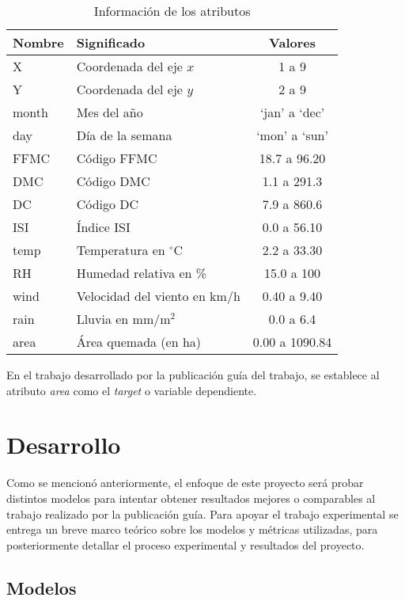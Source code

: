 \documentclass[spanish]{article}
\begin{document}
    \begin{table}[!ht]
    	\centering
      \caption{Información de los atributos}
      \begin{tabular}{llc}
      	\hline
      	Nombre & Significado & Valores \\ \hline \hline
        X & Coordenada del eje $x$ & 1 a 9 \\
        Y & Coordenada del eje $y$ & 2 a 9 \\
        month & Mes del año & `jan' a `dec' \\
        day & Día de la semana & `mon' a `sun' \\ 
        FFMC & Código FFMC  & 18.7 a 96.20 \\
        DMC & Código DMC & 1.1 a 291.3 \\
        DC & Código DC & 7.9 a 860.6 \\
        ISI & Índice ISI  & 0.0 a 56.10 \\
        temp & Temperatura en $^{\circ}$C & 2.2 a 33.30 \\
        RH & Humedad relativa en \% & 15.0 a 100 \\
        wind & Velocidad del viento en km/h & 0.40 a 9.40 \\
        rain & Lluvia en mm/m$^2$ & 0.0 a 6.4 \\
        area & Área quemada (en ha) & 0.00 a 1090.84 \\
        \hline
      \end{tabular}
      \label{tab:attributes}
    \end{table}
    
    En el trabajo desarrollado por la publicación guía del trabajo, se establece al atributo \emph{area}
    como el \emph{target} o variable dependiente.
            
    \section{Desarrollo}
    
      Como se mencionó anteriormente, el enfoque de este proyecto será probar distintos modelos para 
      intentar obtener resultados mejores o comparables al trabajo realizado por la publicación guía. 
      Para apoyar el trabajo experimental se entrega un breve marco teórico sobre los modelos y métricas 
      utilizadas, para posteriormente detallar el proceso experimental y resultados del proyecto.
      
      \subsection{Modelos}
      
\end{document}
